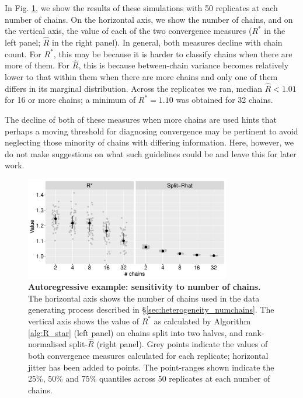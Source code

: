 \documentclass[ba]{imsart}
\numberwithin{equation}{section}
\theoremstyle{plain}
\begin{document}
In Fig. \ref{fig:ar1_numchains}, we show the results of these simulations with 50 replicates at each number of chains. On the horizontal axis, we show the number of chains, and on the vertical axis, the value of each of the two convergence measures ($R^*$ in the left panel; $\widehat{R}$ in the right panel). In general, both measures decline with chain count. For $R^*$, this may be because it is harder to classify chains when there are more of them. For $\widehat{R}$, this is because between-chain variance becomes relatively lower to that within them when there are more chains and only one of them differs in its marginal distribution. Across the replicates we ran, median $\widehat{R}<1.01$ for 16 or more chains; a minimum of $R^*=1.10$ was obtained for 32 chains.

The decline of both of these measures when more chains are used hints that perhaps a moving threshold for diagnosing convergence may be pertinent to avoid neglecting those minority of chains with differing information. Here, however, we do not make suggestions on what such guidelines could be and leave this for later work.

\begin{figure}[!htb]
	\centerline{\includegraphics[width=0.8\textwidth]{ar1_numchains.pdf}}
	\caption{\textbf{Autoregressive example: sensitivity to number of chains.} The horizontal axis shows the number of chains used in the data generating process described in \S\ref{sec:heterogeneity_numchains}. The vertical axis shows the value of $R^*$ as calculated by Algorithm \ref{alg:R_star} (left panel) on chains split into two halves, and rank-normalised split-$\widehat{R}$ (right panel). Grey points indicate the values of both convergence measures calculated for each replicate; horizontal jitter has been added to points. The point-ranges shown indicate the 25\%, 50\% and 75\% quantiles across 50 replicates at each number of chains.}
	\label{fig:ar1_numchains}
\end{figure}
\end{document}
